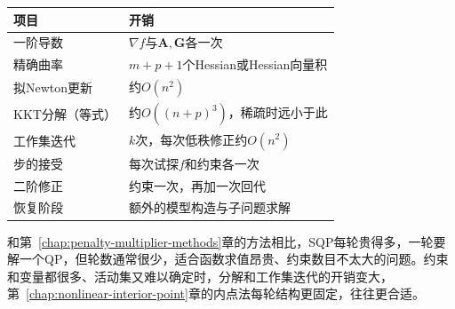 \begin{BookInlineTable}
 \centering
 \begin{tabular}{ll}
  \toprule
  项目 & 开销\\
  \midrule
  一阶导数 & $\nabla f$与$\bm{A},\bm{G}$各一次\\
  精确曲率 & $m+p+1$个Hessian或Hessian向量积\\
  拟Newton更新 & 约$O(n^2)$\\
  KKT分解（等式） & 约$O((n+p)^3)$，稀疏时远小于此\\
  工作集迭代 & $k$次，每次低秩修正约$O(n^2)$\\
  步的接受 & 每次试探$f$和约束各一次\\
  二阶修正 & 约束一次，再加一次回代\\
  恢复阶段 & 额外的模型构造与子问题求解\\
  \bottomrule
 \end{tabular}
 \caption{SQP一轮的主要开销。}
 \label{tab:sqp-cost}
\end{BookInlineTable}

和第~\ref{chap:penalty-multiplier-methods}章的方法相比，SQP每轮贵得多，一轮要解一个QP，但轮数通常很少，适合函数求值昂贵、约束数目不太大的问题。约束和变量都很多、活动集又难以确定时，分解和工作集迭代的开销变大，第~\ref{chap:nonlinear-interior-point}章的内点法每轮结构更固定，往往更合适。
